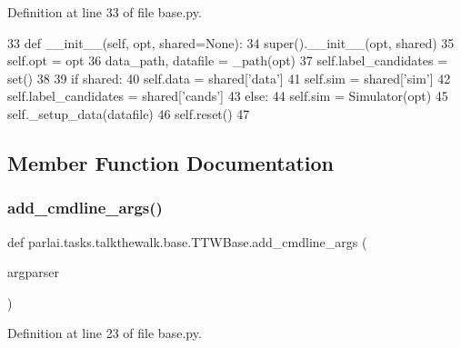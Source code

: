 Definition at line 33 of file base.\+py.


\begin{DoxyCode}
33     \textcolor{keyword}{def }\_\_init\_\_(self, opt, shared=None):
34         super().\_\_init\_\_(opt, shared)
35         self.opt = opt
36         data\_path, datafile = \_path(opt)
37         self.label\_candidates = set()
38 
39         \textcolor{keywordflow}{if} shared:
40             self.data = shared[\textcolor{stringliteral}{'data'}]
41             self.sim = shared[\textcolor{stringliteral}{'sim'}]
42             self.label\_candidates = shared[\textcolor{stringliteral}{'cands'}]
43         \textcolor{keywordflow}{else}:
44             self.sim = Simulator(opt)
45             self.\_setup\_data(datafile)
46         self.reset()
47 
\end{DoxyCode}


\subsection{Member Function Documentation}
\mbox{\label{classparlai_1_1tasks_1_1talkthewalk_1_1base_1_1TTWBase_a58e285e5ba5843219867ad14512bde8a}} 
\subsubsection{\texorpdfstring{add\+\_\+cmdline\+\_\+args()}{add\_cmdline\_args()}}
{\footnotesize\ttfamily def parlai.\+tasks.\+talkthewalk.\+base.\+T\+T\+W\+Base.\+add\+\_\+cmdline\+\_\+args (\begin{DoxyParamCaption}\item[{}]{argparser }\end{DoxyParamCaption})\hspace{0.3cm}{\ttfamily [static]}}



Definition at line 23 of file base.\+py.


